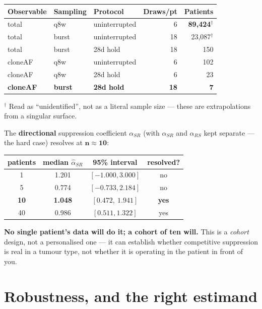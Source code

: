 \documentclass[11pt,a4paper]{article}
\newcommand{\aSR}{\alpha_{SR}}
\newcommand{\aRS}{\alpha_{RS}}
\begin{document}
\begin{center}
\begin{tabular}{lllrr}
\toprule
\textbf{Observable} & \textbf{Sampling} & \textbf{Protocol} & \textbf{Draws/pt} & \textbf{Patients}\\
\midrule
total & q8w & uninterrupted & 6 & \textbf{89{,}424}$^\dagger$\\
total & burst & uninterrupted & 18 & 23{,}087$^\dagger$\\
total & burst & 28d hold & 18 & 150\\
cloneAF & q8w & uninterrupted & 6 & 102\\
cloneAF & q8w & 28d hold & 6 & 23\\
\textbf{cloneAF} & \textbf{burst} & \textbf{28d hold} & \textbf{18} & \textbf{7}\\
\bottomrule
\end{tabular}
\end{center}

{\small $^\dagger$ Read as ``unidentified'', not as a literal sample size --- these
are extrapolations from a singular surface.}

The \textbf{directional} suppression coefficient $\aSR$ (with $\aSR$ and $\aRS$ kept
separate --- the hard case) resolves at $\mathbf{n \approx 10}$:

\begin{center}
\begin{tabular}{cccc}
\toprule
\textbf{patients} & \textbf{median $\hat{\alpha}_{SR}$} & \textbf{95\% interval} & \textbf{resolved?}\\
\midrule
1 & 1.201 & $[-1.000, 3.000]$ & no\\
5 & 0.774 & $[-0.733, 2.184]$ & no\\
\textbf{10} & \textbf{1.048} & $\mathbf{[0.472,\ 1.941]}$ & \textbf{yes}\\
40 & 0.986 & $[0.511, 1.322]$ & yes\\
\bottomrule
\end{tabular}
\end{center}

\textbf{No single patient's data will do it; a cohort of ten will.} This is a
\emph{cohort} design, not a personalised one --- it can establish whether
competitive suppression is real in a tumour type, not whether it is operating in
the patient in front of you.

\section{Robustness, and the right estimand}
\end{document}
